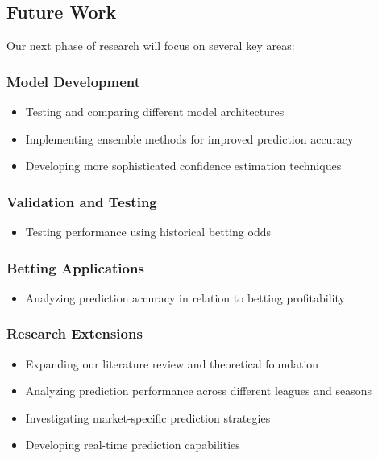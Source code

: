 \documentclass[conference]{IEEEtran}
\begin{document}
\subsection{Future Work}
Our next phase of research will focus on several key areas:

\subsubsection{Model Development}
\begin{itemize}
\item Testing and comparing different model architectures
\item Implementing ensemble methods for improved prediction accuracy
\item Developing more sophisticated confidence estimation techniques
\end{itemize}

\subsubsection{Validation and Testing}
\begin{itemize}
\item Testing performance using historical betting odds
\end{itemize}

\subsubsection{Betting Applications}
\begin{itemize}
\item Analyzing prediction accuracy in relation to betting profitability
\end{itemize}

\subsubsection{Research Extensions}
\begin{itemize}
\item Expanding our literature review and theoretical foundation
\item Analyzing prediction performance across different leagues and seasons
\item Investigating market-specific prediction strategies
\item Developing real-time prediction capabilities
\end{itemize}
\end{document}
